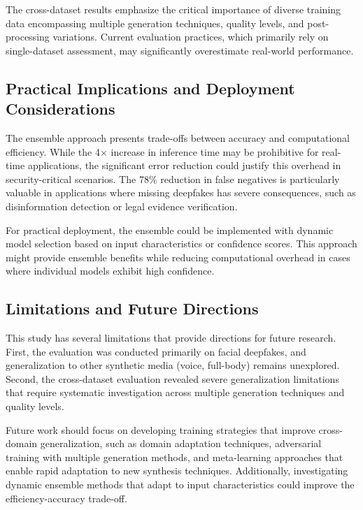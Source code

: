 \documentclass[conference]{IEEEtran}
\begin{document}
The cross-dataset results emphasize the critical importance of diverse training data encompassing multiple generation techniques, quality levels, and post-processing variations. Current evaluation practices, which primarily rely on single-dataset assessment, may significantly overestimate real-world performance.

\subsection{Practical Implications and Deployment Considerations}

The ensemble approach presents trade-offs between accuracy and computational efficiency. While the 4× increase in inference time may be prohibitive for real-time applications, the significant error reduction could justify this overhead in security-critical scenarios. The 78\% reduction in false negatives is particularly valuable in applications where missing deepfakes has severe consequences, such as disinformation detection or legal evidence verification.

For practical deployment, the ensemble could be implemented with dynamic model selection based on input characteristics or confidence scores. This approach might provide ensemble benefits while reducing computational overhead in cases where individual models exhibit high confidence.

\subsection{Limitations and Future Directions}

This study has several limitations that provide directions for future research. First, the evaluation was conducted primarily on facial deepfakes, and generalization to other synthetic media (voice, full-body) remains unexplored. Second, the cross-dataset evaluation revealed severe generalization limitations that require systematic investigation across multiple generation techniques and quality levels.

Future work should focus on developing training strategies that improve cross-domain generalization, such as domain adaptation techniques, adversarial training with multiple generation methods, and meta-learning approaches that enable rapid adaptation to new synthesis techniques. Additionally, investigating dynamic ensemble methods that adapt to input characteristics could improve the efficiency-accuracy trade-off.
\end{document}
